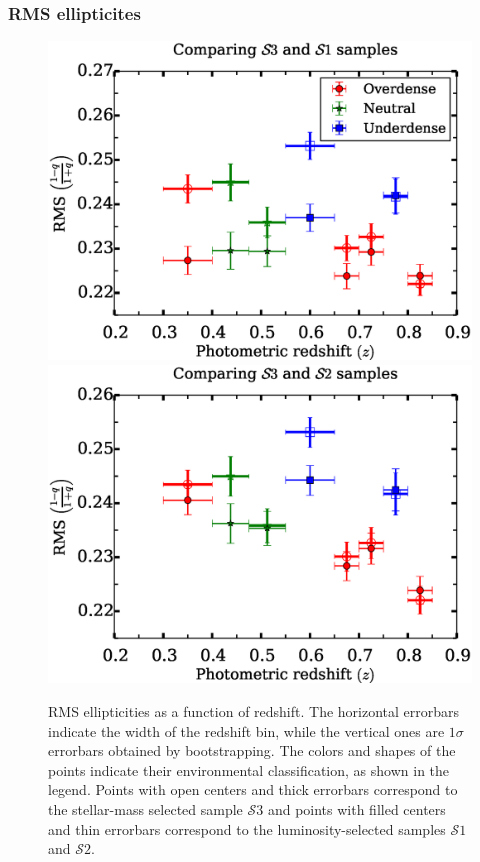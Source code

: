 \documentclass[twocolumn,useAMS,usenatbib]{mn2e}
\newcommand{\s}{\ensuremath{\mathcal{S}}}
\begin{document}
\subsubsection{RMS ellipticites}
\begin{figure}
 \centering
 \includegraphics[width=1.0\columnwidth]{rms_ellip1_noevolution.eps} \\
 \includegraphics[width=1.0\columnwidth]{rms_ellip1_Bbandevolution.eps} \\
 \caption{RMS ellipticities as a function of redshift. The horizontal errorbars indicate
          the width of the redshift bin, while the vertical ones
          are $1\sigma$ errorbars obtained by
          bootstrapping. The colors and shapes of the points indicate their
          environmental classification, as shown in the legend. Points with open centers and thick errorbars correspond to the stellar-mass selected sample \s$3$
          and points with filled centers and thin errorbars correspond to the luminosity-selected samples \s$1$ and \s$2$.             
          }
 \label{fig:rms_ellip}


\end{figure}
\end{document}
